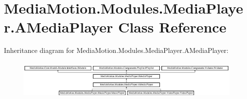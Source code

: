 \hypertarget{class_media_motion_1_1_modules_1_1_media_player_1_1_a_media_player}{\section{Media\+Motion.\+Modules.\+Media\+Player.\+A\+Media\+Player Class Reference}
\label{class_media_motion_1_1_modules_1_1_media_player_1_1_a_media_player}
}
Inheritance diagram for Media\+Motion.\+Modules.\+Media\+Player.\+A\+Media\+Player\+:\begin{figure}[H]
\begin{center}
\leavevmode
\includegraphics[height=2.012578cm]{class_media_motion_1_1_modules_1_1_media_player_1_1_a_media_player}
\end{center}
\end{figure}

